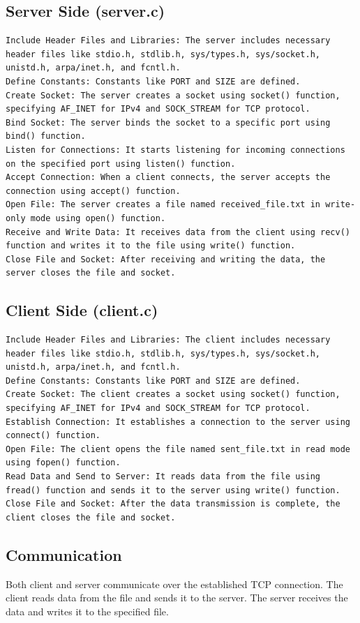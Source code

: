 \documentclass{article}
\begin{document}
\subsection{Server Side (server.c)}
\begin{verbatim}
Include Header Files and Libraries: The server includes necessary header files like stdio.h, stdlib.h, sys/types.h, sys/socket.h, unistd.h, arpa/inet.h, and fcntl.h.
Define Constants: Constants like PORT and SIZE are defined.
Create Socket: The server creates a socket using socket() function, specifying AF_INET for IPv4 and SOCK_STREAM for TCP protocol.
Bind Socket: The server binds the socket to a specific port using bind() function.
Listen for Connections: It starts listening for incoming connections on the specified port using listen() function.
Accept Connection: When a client connects, the server accepts the connection using accept() function.
Open File: The server creates a file named received_file.txt in write-only mode using open() function.
Receive and Write Data: It receives data from the client using recv() function and writes it to the file using write() function.
Close File and Socket: After receiving and writing the data, the server closes the file and socket.
\end{verbatim}

\subsection{Client Side (client.c)}
\begin{verbatim}
Include Header Files and Libraries: The client includes necessary header files like stdio.h, stdlib.h, sys/types.h, sys/socket.h, unistd.h, arpa/inet.h, and fcntl.h.
Define Constants: Constants like PORT and SIZE are defined.
Create Socket: The client creates a socket using socket() function, specifying AF_INET for IPv4 and SOCK_STREAM for TCP protocol.
Establish Connection: It establishes a connection to the server using connect() function.
Open File: The client opens the file named sent_file.txt in read mode using fopen() function.
Read Data and Send to Server: It reads data from the file using fread() function and sends it to the server using write() function.
Close File and Socket: After the data transmission is complete, the client closes the file and socket.
\end{verbatim}

\subsection{Communication}
Both client and server communicate over the established TCP connection. The client reads data from the file and sends it to the server. The server receives the data and writes it to the specified file.
\end{document}
